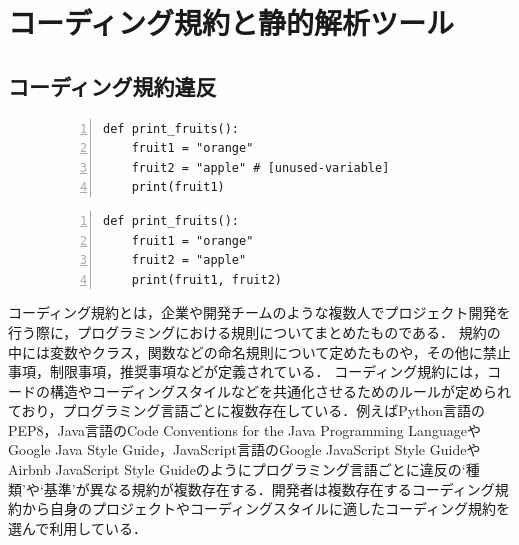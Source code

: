 \documentclass[submit,noauthor,dvipdfmx]{ipsj}
\begin{document}
\section{コーディング規約と静的解析ツール}\label{chap:background}
\subsection{コーディング規約違反}


\begin{figure}[t]
\vspace{-16pt}
    \begin{lstlisting}[caption={[upper/lower text]%
               \begin{tabular}[t]{@{}l@{}}
                problematic.py \\[1.0\normalbaselineskip]
               \end{tabular}},frame={tb},numbers=left,label=problematic,identifierstyle={\small}]
def print_fruits():
    fruit1 = "orange"
    fruit2 = "apple" # [unused-variable]
    print(fruit1)
\end{lstlisting}
\vspace{-8mm}
\end{figure}

\begin{figure}[t]
    \begin{lstlisting}[caption={[upper/lower text]%
               \begin{tabular}[t]{@{}l@{}}
                correct.py \\[1.0\normalbaselineskip]
               \end{tabular}},frame={tb},numbers=left,label=correct,identifierstyle={\small}]
def print_fruits():
    fruit1 = "orange"
    fruit2 = "apple"
    print(fruit1, fruit2)
\end{lstlisting}
\end{figure}



コーディング規約とは，企業や開発チームのような複数人でプロジェクト開発を行う際に，プログラミングにおける規則についてまとめたものである．
規約の中には変数やクラス，関数などの命名規則について定めたものや，その他に禁止事項，制限事項，推奨事項などが定義されている．
コーディング規約には，コードの構造やコーディングスタイルなどを共通化させるためのルールが定められており，プログラミング言語ごとに複数存在している．例えばPython言語のPEP8，Java言語のCode Conventions for the Java Programming LanguageやGoogle Java Style Guide，JavaScript言語のGoogle JavaScript Style GuideやAirbnb JavaScript Style Guideのようにプログラミング言語ごとに違反の`種類'や`基準'が異なる規約が複数存在する．開発者は複数存在するコーディング規約から自身のプロジェクトやコーディングスタイルに適したコーディング規約を選んで利用している．
\end{document}
